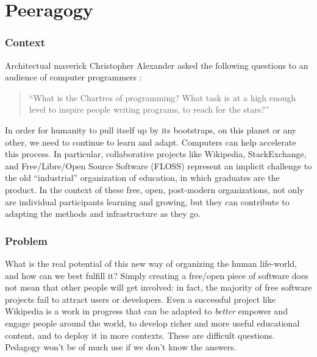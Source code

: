 \begingroup
\color{OliveGreen}

\section{Peeragogy}\label{sec:Peeragogy_Project}

\subsubsection*{Context}  Architectual maverick Christopher Alexander asked the following questions to an audience of computer programmers \cite{alexander1999origins}: 
\begin{quote}
``What is the Chartres of programming? What task is at a high enough level to inspire people writing programs, to reach for the stars?''
\end{quote}
In order for humanity to pull itself up by its bootstraps, on this planet or any other, we need to continue to learn and adapt.  Computers can help accelerate this process.  In particular, collaborative projects like Wikipedia, StackExchange, and Free/Libre/Open Source Software (FLOSS) represent an implicit challenge to the old ``industrial'' organization of education, in which graduates are the product.  In the context of these free, open, post-modern organizations, not only are individual participants learning and growing, but they can contribute to adapting the methods and infrastructure as they go.

\subsubsection*{Problem} What is the real potential of this new way of organizing the human life-world, and how can we best fulfill it?  Simply creating a free/open piece of software does not mean that other people will get involved: in fact, the majority of free software projects fail to attract users or developers.  Even a successful project like Wikipedia is a work in progress that can be adapted to \emph{better} empower and engage people around the world, to develop richer and more useful educational content, and to deploy it in more contexts.  These are difficult questions.  Pedagogy won't be of much use if we don't know the answers.

